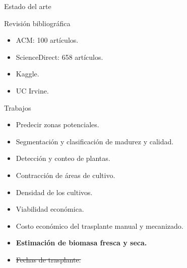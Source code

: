 \documentclass[aspectratio=169]{beamer}
\begin{document}
\begin{frame}{Estado del arte}
	\vspace{-1cm}\begin{minipage}{0.4\textwidth}
		\begin{block}{Revisión bibliográfica}
			\begin{itemize}
				\item ACM: 100 artículos.
				\item ScienceDirect: 658 artículos.
				\item Kaggle.
				\item UC Irvine.
			\end{itemize}
		\end{block}
	\end{minipage}%
	\pause\begin{minipage}{0.6\textwidth}
		\begin{block}{Trabajos}
			\begin{itemize}
				\item Predecir zonas potenciales.
				\item Segmentación y clasificación de madurez y calidad.
				\item Detección y conteo de plantas.
				\item Contracción de áreas de cultivo.
				\item Densidad de los cultivos.
				\item Viabilidad económica.
				\item Costo económico del trasplante manual y mecanizado.
				\pause\item \bf Estimación de biomasa fresca y seca.
				\pause\item \sout{Fechas de trasplante.}
			\end{itemize}
		\end{block}
	\end{minipage}%
\end{frame}
\end{document}
